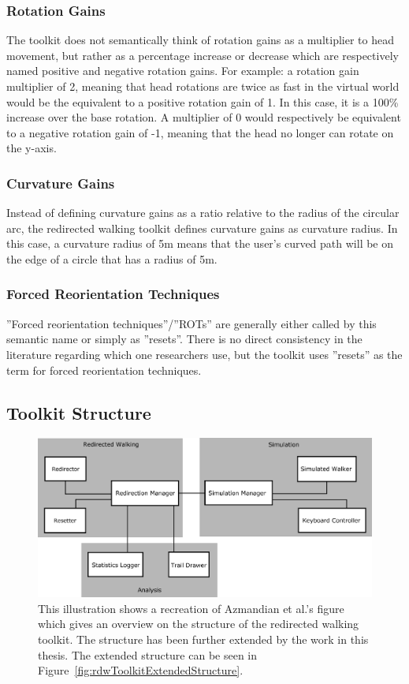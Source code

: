 \subsubsection{Rotation Gains}
The toolkit does not semantically think of rotation gains as a multiplier to head movement, but rather as a percentage increase or decrease which are respectively named positive and negative rotation gains. For example: a rotation gain multiplier of 2, meaning that head rotations are twice as fast in the virtual world would be the equivalent to a positive rotation gain of 1. In this case, it is a 100\% increase over the base rotation. A multiplier of 0 would respectively be equivalent to a negative rotation gain of -1, meaning that the head no longer can rotate on the y-axis.

\subsubsection{Curvature Gains}
Instead of defining curvature gains as a ratio relative to the radius of the circular arc, the redirected walking toolkit defines curvature gains as curvature radius. In this case, a curvature radius of 5m means that the user's curved path will be on the edge of a circle that has a radius of 5m. 

\subsubsection{Forced Reorientation Techniques}
''Forced reorientation techniques''/''ROTs'' are generally either called by this semantic name or simply as ''resets''. There is no direct consistency in the literature regarding which one researchers use, but the toolkit uses ''resets'' as the term for forced reorientation techniques. 

\subsection{Toolkit Structure}
\begin{figure}[tbph]
    \centering
    \includegraphics[width=1.0\textwidth]{figures/graphs/ToolkitStructure.png}
    \caption[Structure of the Redirected Walking Toolkit]{This illustration shows a recreation of Azmandian et al.'s figure~\cite{azmandian2016redirected} which gives an overview on the structure of the redirected walking toolkit. The structure has been further extended by the work in this thesis. The extended structure can be seen in Figure~\ref{fig:rdwToolkitExtendedStructure}.}
    \label{fig:rdwToolkitStructure}
\end{figure}

